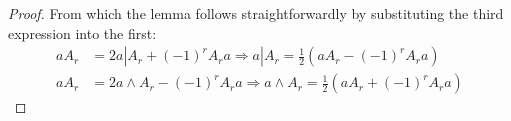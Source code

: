 \begin{proof}
	From which the lemma follows straightforwardly by substituting the third expression into the first:
	\begin{align*}
		aA_r &= 2a | A_r + (-1)^rA_ra \Rightarrow a | A_r = \frac{1}{2} (aA_r - (-1)^rA_ra) \\
		aA_r &= 2a \wedge A_r - (-1)^rA_ra \Rightarrow a \wedge A_r = \frac{1}{2} (aA_r + (-1)^rA_ra)
	\end{align*}
\end{proof}
